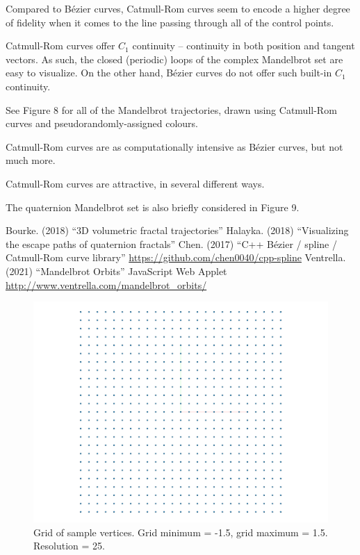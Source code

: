 \documentclass[12pt]{article}
\begin{document}
Compared to  B\'ezier curves, Catmull-Rom curves seem to encode a higher degree of fidelity when it comes to the line passing through all of the control points.

Catmull-Rom curves offer $C_1$ continuity -- continuity in both position and tangent vectors.
As such, the closed (periodic) loops of the complex Mandelbrot set are easy to visualize.
On the other hand, B\'ezier curves do not offer such built-in $C_1$ continuity.

See Figure 8 for all of the Mandelbrot trajectories, drawn using Catmull-Rom curves and pseudorandomly-assigned colours.

Catmull-Rom curves are as computationally intensive as B\'ezier curves, but not much more.

Catmull-Rom curves are attractive, in several different ways.

The quaternion Mandelbrot set is also briefly considered in Figure 9.






\begin{thebibliography}{9}
 Bourke. (2018) ``3D volumetric fractal trajectories''
 Halayka. (2018) ``Visualizing the escape paths of quaternion fractals''
 Chen. (2017) ``C++ B\'ezier / spline / Catmull-Rom curve library'' \linebreak \url{https://github.com/chen0040/cpp-spline}
 Ventrella. (2021) ``Mandelbrot Orbits'' JavaScript Web Applet \linebreak \url{http://www.ventrella.com/mandelbrot_orbits/}



\end{thebibliography}



\pagebreak

\begin{figure} 
\centering
  \includegraphics[width = 5 in]{grid.png}	
  \caption{Grid of sample vertices.
Grid minimum = -1.5, grid maximum = 1.5.
Resolution = 25.
}
\end{figure}
\end{document}
